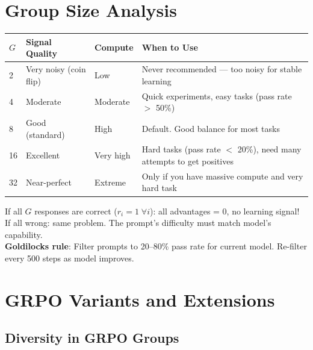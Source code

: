 \section{Group Size Analysis}
\label{group-size-analysis}

\begin{tabular}{@{}lp{3.5cm}p{3.5cm}p{6cm}@{}}
\toprule
$G$ & \textbf{Signal Quality} & \textbf{Compute} & \textbf{When to Use} \\
\midrule
2 & Very noisy (coin flip) & Low & Never recommended --- too noisy for stable learning \\
4 & Moderate & Moderate & Quick experiments, easy tasks (pass rate $>$ 50\%) \\
8 & Good (standard) & High & Default. Good balance for most tasks \\
16 & Excellent & Very high & Hard tasks (pass rate $<$ 20\%), need many attempts to get positives \\
32 & Near-perfect & Extreme & Only if you have massive compute and very hard task \\
\bottomrule
\end{tabular}

\begin{keybox}
If all $G$ responses are correct ($r_i = 1 \;\forall i$): all advantages = 0, no learning signal!\\

If all wrong: same problem. The prompt’s difficulty must match model’s capability.\\

\textbf{Goldilocks rule}: Filter prompts to 20--80\% pass rate for current model. Re-filter every 500 steps as model improves.
\end{keybox}

\section{GRPO Variants and Extensions}
\label{grpo-variants-and-extensions}

\subsection{Diversity in GRPO Groups}
\label{diversity-in-grpo-groups}

